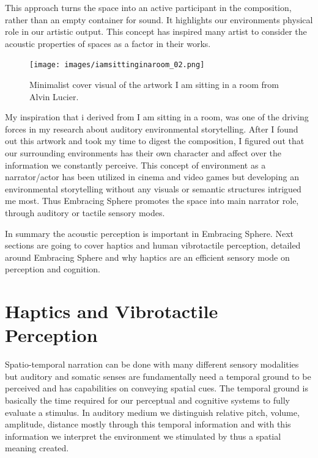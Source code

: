                 This approach turns the space into an active participant in the composition, rather than an empty container for sound. It highlights our environments physical role in our artistic output. This concept has inspired many artist to consider the acoustic properties of spaces as a factor in their works\cite{Lucier_phd}.\par

                \begin{figure}[H]
                    \centering
                    \texttt{[image: images/iamsittinginaroom\_02.png]}
                    \caption{Minimalist cover visual of the artwork I am sitting in a room from Alvin Lucier.}
                    \label{fig:IASIAR_02}
                \end{figure}

                My inspiration that i derived from I am sitting in a room, was one of the driving forces in my research about auditory environmental storytelling. After I found out this artwork and took my time to digest the composition, I figured out that our surrounding environments has their own character and affect over the information we constantly perceive. This concept of environment as a narrator/actor has been utilized in cinema and video games but developing an environmental storytelling without any visuals or semantic structures intrigued me most. Thus Embracing Sphere promotes the space into main narrator role, through auditory or tactile sensory modes.\par
                
                In summary the acoustic perception is important in Embracing Sphere. Next sections are going to cover haptics and human vibrotactile perception, detailed around Embracing Sphere and why haptics are an efficient sensory mode on perception and cognition.\par
    \section{Haptics and Vibrotactile Perception}
        Spatio-temporal narration can be done with many different sensory modalities but auditory and somatic senses are fundamentally need a temporal ground to be perceived and has capabilities on conveying spatial cues\cite{Haptic_Perception-A_Tutorial}. The temporal ground is basically the time required for our perceptual and cognitive systems to fully evaluate a stimulus\cite{Haptic_Perception-A_Tutorial}. In auditory medium we distinguish relative pitch, volume, amplitude, distance mostly through this temporal information and with this information we interpret the environment we stimulated by thus a spatial meaning created.\cite{Haptic_Rendering}\par

